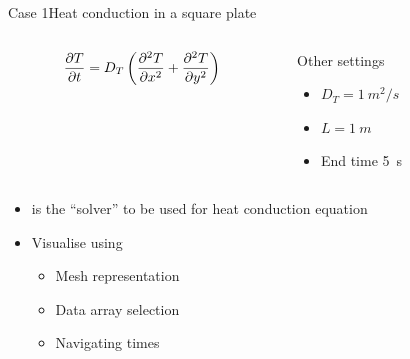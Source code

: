 \begin{frame}{Case 1}{Heat conduction in a square plate}
    \begin{columns}
        \begin{column}{0.5\linewidth}
            \begin{equation*}
                \pder{T}{t} = D_T \left( \pder[2]{T}{x} + \pder[2]{T}{y} \right)
            \end{equation*}
            \begin{figure}
            \end{figure}
        \end{column}
        \begin{column}{0.5\linewidth}
            Other settings
            \begin{itemize}
                \item $D_T=\qty{1}{m^2/s}$
                \item $L=\qty{1}{m}$
                \item End time \qty{5}{s}
            \end{itemize}
        \end{column}
    \end{columns}
    \begin{itemize}
        \item \lapfoam{} is the ``solver'' to be used for heat conduction equation
        \item Visualise using \parafoam
        \begin{itemize}
            \item Mesh representation
            \item Data array selection
            \item Navigating times
        \end{itemize}
    \end{itemize}
\end{frame}


